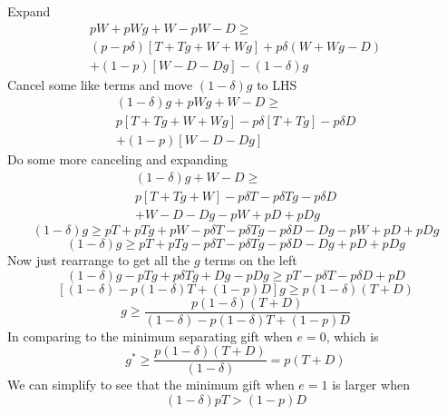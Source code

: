 \documentclass[12pt]{article}
\newcommand{\de}{\delta}
\begin{document}
Expand
\begin{multline*}
  pW + pWg + W - pW - D \geq \\
	\left(p-p\de \right) \left[T+Tg + W+Wg \right] + p\de \left(W+Wg - D\right) \\ + (1-p) \left[W - D -Dg\right] - \left(1-\de \right) g
\end{multline*}
Cancel some like terms and move $\left(1-\de \right) g$ to LHS
\begin{multline*}
  \left(1-\de \right) g + pWg + W - D \geq \\
	p\left[T+Tg + W+Wg \right] -p\de \left[T+Tg \right] - p\de D \\ + (1-p) \left[W - D -Dg\right] 
\end{multline*}
Do some more canceling and expanding
\begin{multline*}
  \left(1-\de \right) g + W - D \geq \\
	p\left[T+Tg + W\right] -p\de T -p\de Tg - p\de D \\ + W - D -Dg -pW +pD +pDg
\end{multline*}
\[
  \left(1-\de \right) g \geq 
	pT+pTg + pW -p\de T -p\de Tg - p\de D  -Dg -pW +pD +pDg
\]
\[
  \left(1-\de \right) g \geq pT+pTg -p\de T -p\de Tg - p\de D  -Dg +pD +pDg
\]
Now just rearrange to get all the $g$ terms on the left
\[
  \left(1-\de \right) g -pTg + p\de Tg + Dg - pDg\geq pT -p\de T - p\de D +pD
\]
\[
  \left[\left(1-\de \right) -p(1-\de)T +(1-p)D\right]g \geq p(1-\de)(T + D)
\]
\[
  g \geq \frac{p(1-\de)(T + D)}{\left(1-\de \right) -p(1-\de)T +(1-p)D}
\]
In comparing to the minimum separating gift when $e=0$, which is
\[
  g^* \geq \frac{p(1-\de)(T + D)}{\left(1-\de \right)} = p(T + D)
\]
We can simplify to see that the minimum gift when $e=1$ is larger when
\[
  (1-\de)pT > (1-p)D
\]
\end{document}
